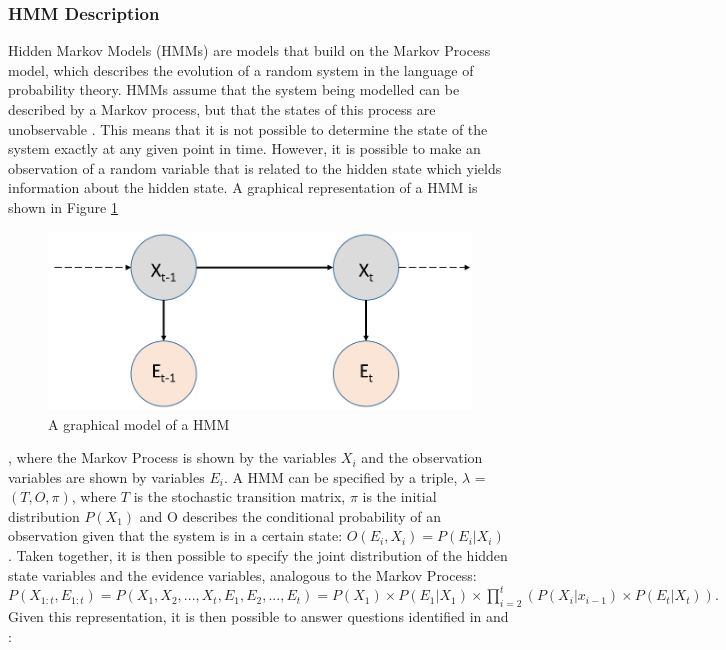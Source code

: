 \subsubsection{HMM Description}\label{subsubsec:HMMDesc}
Hidden Markov Models (HMMs) are models that build on the Markov Process model, which describes the evolution of a random system in the language of probability theory. HMMs assume that the system being modelled can be described by a Markov process, but that the states of this process are unobservable \cite{Ghahramani2001AnNetworks}. This means that it is not possible to determine the state of the system exactly at any given point in time. However, it is possible to make an observation of a random variable that is related to the hidden state which yields information about the hidden state. A graphical representation of a HMM is shown in Figure \ref{fig:hmm}
\begin{figure}[]
    \centering
    \includegraphics[width=0.8\linewidth]{Chapters/BackgroundKnowledgeAndRelatedWork/MultiAgentTargetDetectionBackground/Figs/HMMs/HMMGraphicalModel.png}
    \caption{A graphical model of a HMM}
    \label{fig:hmm}
\end{figure}, where the Markov Process is shown by the variables $X_i$ and the observation variables are shown by variables $E_i$. A HMM can be specified by a triple, $\lambda$ = $(T, O, \pi)$, where $T$ is the stochastic transition matrix, $\pi$ is the initial distribution $P(X_1)$ and O describes the conditional probability of an observation given that the system is in a certain state: $O(E_i, X_i) = P(E_{i} | X_{i})$ \cite{Rabiner1989ARecognition}. Taken together, it is then possible to specify the joint distribution of the hidden state variables and the evidence variables, analogous to the Markov Process: 
$
P(X_{1:t}, E_{1:t}) = P(X_1, X_2, ..., X_t, E_1, E_2, ..., E_t) = P(X_1) \times P(E_1 | X_1) \times
\prod_{i=2}^{t}{(P(X_i | x_{i-1}) \times P(E_t | X_t))}.
$Given this representation, it is then possible to answer questions identified in \cite{Rabiner1989ARecognition} and \cite{Murphy1994DynamicLearning}:
